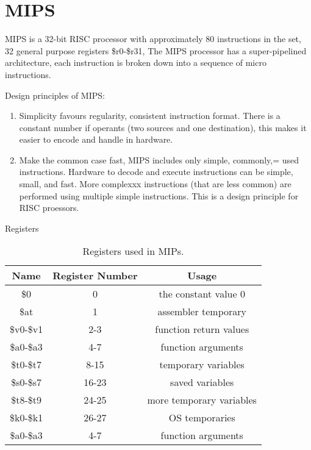 \chapter{MIPS}

\begin{definition}
    MIPS is a 32-bit RISC processor with approximately 80 instructions in the set, 32 general purpose registers \$r0-\$r31, The MIPS processor has a super-pipelined architecture, each instruction is broken down into a sequence of micro instructions.
\end{definition}

Design principles of MIPS:
\begin{enumerate}
    \item Simplicity favours regularity, consistent instruction format. There is a constant number if operants (two sources and one destination), this makes it easier to encode and handle in hardware.
    
    \item Make the common case fast, MIPS includes only simple, commonly,= used instructions. Hardware to decode and execute instructions can be simple, small, and fast. More complexxx instructions (that are less common) are performed using multiple simple instructions. This is a design principle for RISC proessors.
\end{enumerate}

Registers
\begin{table}
    \centering
    \begin{tabular}{ccc}
        \toprule
        Name & Register Number & Usage \\
        \midrule
        \$0 & 0 & the constant value 0 \\
        \$at & 1 & assembler temporary \\
        \$v0-\$v1 & 2-3 & function return values \\
        \$a0-\$a3 & 4-7 & function arguments \\
        \$t0-\$t7 & 8-15 & temporary variables \\
        \$s0-\$s7 & 16-23 & saved variables \\
        \$t8-\$t9 & 24-25 & more temporary variables \\
        \$k0-\$k1 & 26-27 & OS temporaries \\
        \$a0-\$a3 & 4-7 & function arguments \\
        \bottomrule
    \end{tabular}
    \caption{Registers used in MIPs.}
    \label{tab:mips_register}
\end{table}

